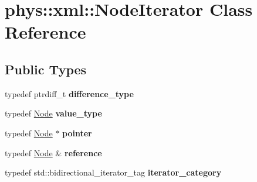 \hypertarget{classphys_1_1xml_1_1NodeIterator}{
\section{phys::xml::NodeIterator Class Reference}
\label{da/d4f/classphys_1_1xml_1_1NodeIterator}
}
\subsection*{Public Types}
\begin{DoxyCompactItemize}
\item 
\hypertarget{classphys_1_1xml_1_1NodeIterator_a2f5acd5f69654c26de62c2f63c988c43}{
typedef ptrdiff\_\-t {\bfseries difference\_\-type}}
\label{da/d4f/classphys_1_1xml_1_1NodeIterator_a2f5acd5f69654c26de62c2f63c988c43}

\item 
\hypertarget{classphys_1_1xml_1_1NodeIterator_adafe2be70385ec3c79058227ed2976f8}{
typedef \hyperlink{classphys_1_1xml_1_1Node}{Node} {\bfseries value\_\-type}}
\label{da/d4f/classphys_1_1xml_1_1NodeIterator_adafe2be70385ec3c79058227ed2976f8}

\item 
\hypertarget{classphys_1_1xml_1_1NodeIterator_a197734b49841230f6162cac3f304befb}{
typedef \hyperlink{classphys_1_1xml_1_1Node}{Node} $\ast$ {\bfseries pointer}}
\label{da/d4f/classphys_1_1xml_1_1NodeIterator_a197734b49841230f6162cac3f304befb}

\item 
\hypertarget{classphys_1_1xml_1_1NodeIterator_a5ee512d5fc1fd4fc9ab3d6eaefd83c87}{
typedef \hyperlink{classphys_1_1xml_1_1Node}{Node} \& {\bfseries reference}}
\label{da/d4f/classphys_1_1xml_1_1NodeIterator_a5ee512d5fc1fd4fc9ab3d6eaefd83c87}

\item 
\hypertarget{classphys_1_1xml_1_1NodeIterator_a98c5f86374f6d5133ed91ed2610cb73a}{
typedef std::bidirectional\_\-iterator\_\-tag {\bfseries iterator\_\-category}}
\label{da/d4f/classphys_1_1xml_1_1NodeIterator_a98c5f86374f6d5133ed91ed2610cb73a}

\end{DoxyCompactItemize}
